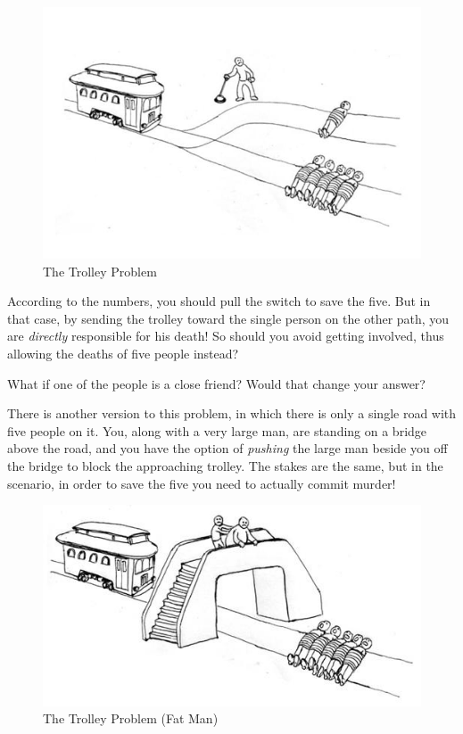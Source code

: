 \begin{figure}[!ht]
    \centering
    \includegraphics[width=\textwidth]{images/The_Trolley_Problem.jpg}
    \caption{The Trolley Problem} \label{fig:trolley_problem}
\end{figure}

According to the numbers, you should pull the switch to save the five. But in that case, by sending the trolley toward the single person on the other path, you are \textit{directly} responsible for his death! So should you avoid getting involved, thus allowing the deaths of five people instead?

What if one of the people is a close friend? Would that change your answer?

There is another version to this problem, in which there is only a single road with five people on it. You, along with a very large man, are standing on a bridge above the road, and you have the option of \textit{pushing} the large man beside you off the bridge to block the approaching trolley. The stakes are the same, but in the scenario, in order to save the five you need to actually commit murder!

\begin{figure}[!ht]
    \centering
    \includegraphics[width=\textwidth]{images/The_Trolley_Problem_Fat_Man.jpg}
    \caption{The Trolley Problem (Fat Man)}
    \label{fig:trolley_problem_fat_man}
\end{figure}

